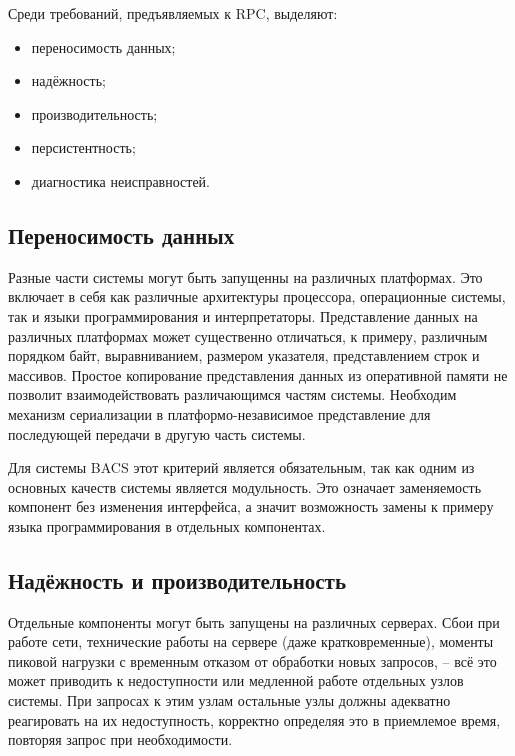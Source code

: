 Среди требований, предъявляемых к RPC, выделяют:
\begin{itemize}
    \item переносимость данных;
    \item надёжность;
    \item производительность;
    \item персистентность;
    \item диагностика неисправностей.
\end{itemize}

\subsection{Переносимость данных}
Разные части системы могут быть запущенны на различных платформах.
Это включает в себя как различные архитектуры процессора, операционные системы,
так и языки программирования и интерпретаторы. Представление данных на различных
платформах может существенно отличаться, к примеру, различным порядком байт,
выравниванием, размером указателя, представлением строк и массивов. Простое
копирование представления данных из оперативной памяти не позволит
взаимодействовать различающимся частям системы. Необходим механизм сериализации
в платформо-независимое представление для последующей передачи в другую часть
системы.

Для системы BACS этот критерий является обязательным, так как одним из основных
качеств системы является модульность. Это означает заменяемость компонент
без изменения интерфейса, а значит возможность замены к примеру языка
программирования в отдельных компонентах.

\subsection{Надёжность и производительность}
Отдельные компоненты могут быть запущены на различных серверах. Сбои при работе
сети, технические работы на сервере (даже кратковременные), моменты пиковой
нагрузки с временным отказом от обработки новых запросов, – всё это может
приводить к недоступности или медленной работе отдельных узлов системы.
При запросах к этим узлам остальные узлы должны адекватно реагировать на их
недоступность, корректно определяя это в приемлемое время, повторяя запрос
при необходимости.

